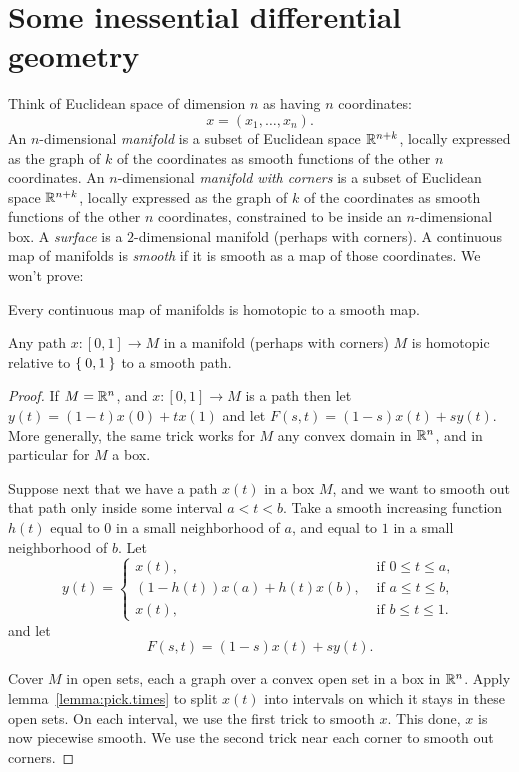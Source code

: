 \section{Some inessential differential geometry}
Think of Euclidean space of dimension \(n\) as having \(n\) coordinates: 
\[
x=(x_1,\dots,x_n).
\]
An \(n\)-dimensional  \emph{manifold} is a subset of Euclidean space \(\mathbb{R}^{n+k}\), locally expressed as the graph of \(k\) of the coordinates as smooth functions of the other \(n\) coordinates.
An \(n\)-dimensional  \emph{manifold with corners} is a subset of Euclidean space \(\mathbb{R}^{n+k}\), locally expressed as the graph of \(k\) of the coordinates as smooth functions of the other \(n\) coordinates, constrained to be inside an \(n\)-dimensional box.
A \emph{surface} is a \(2\)-dimensional manifold (perhaps with corners).
A continuous map of manifolds is \emph{smooth} if it is smooth as a map of those coordinates.
We won't prove:
\begin{theorem}
Every continuous map of manifolds is homotopic to a smooth map.
\end{theorem}
\begin{lemma}
Any path \(x \colon [0,1] \to M\) in a manifold (perhaps with corners) \(M\) is homotopic relative to \(\Set{0,1}\) to a smooth path.
\end{lemma}
\begin{proof}
If \(M=\mathbb{R}^{n}\), and \(x \colon [0,1] \to M\) is a path then let \(y(t)=(1-t)x(0)+tx(1)\) and let \(F(s,t)=(1-s)x(t)+sy(t)\).
More generally, the same trick works for \(M\) any convex domain in \(\mathbb{R}^{n}\), and in particular for \(M\) a box.

Suppose next that we have a path \(x(t)\) in a box \(M\), and we want to smooth out that path only inside some interval \(a < t < b\).
Take a smooth increasing function \(h(t)\) equal to \(0\) in a small neighborhood of \(a\), and equal to \(1\) in a small neighborhood of \(b\).
Let
\[
y(t) =
\begin{cases}
x(t), & \text{ if \(0 \le t \le a\)}, \\
(1-h(t))x(a)+h(t)x(b), & \text{ if \(a \le t \le b\)}, \\
x(t), & \text{ if \(b \le t \le 1\)}.
\end{cases}
\]
and let
\[
F(s,t)=(1-s)x(t)+sy(t).
\]

Cover \(M\) in open sets, each a graph over a convex open set in a box in \(\mathbb{R}^{n}\).
Apply lemma~\vref{lemma:pick.times} to split \(x(t)\) into intervals on which it stays in these open sets.
On each interval, we use the first trick to smooth \(x\).
This done, \(x\) is now piecewise smooth.
We use the second trick near each corner to smooth out corners.
\end{proof}

